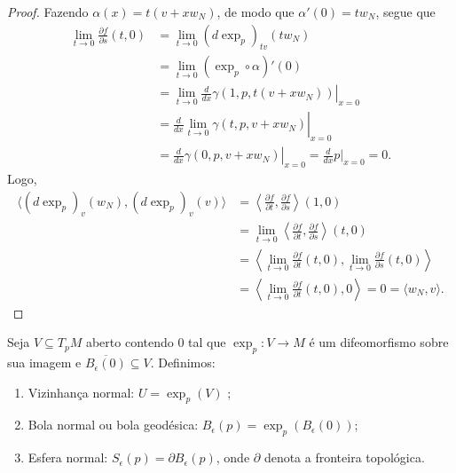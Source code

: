 \begin{theorem}
\begin{proof}
        Fazendo $\alpha(x) =t(v+xw_{N})$, de modo que $\alpha'(0)=tw_{N}$, segue que
        \begin{align*}
            \lim_{t \to 0} \frac{\partial f}{\partial s}(t,0) & = \lim_{t \to 0} (d\exp_p)_{tv} (t w_N)                                                   \\
                                                              & = \lim_{t \to 0} (\exp_p \circ \alpha)'(0)                                                \\
                                                              & = \lim_{t \to 0} \left. \frac{d}{dx} \gamma(1, p, t(v + x w_N)) \right|_{x=0}             \\
                                                              & = \left. \frac{d}{dx} \lim_{t \to 0} \gamma(t, p, v + x w_N) \right|_{x=0}                \\
                                                              & = \left. \frac{d}{dx} \gamma(0, p, v + x w_N) \right|_{x=0}  = \frac{d}{dx} p|_{x=0} = 0.
        \end{align*}
        Logo,
        \begin{align*}
            \langle (d\exp_p)_v (w_N), (d\exp_p)_v (v) \rangle & = \left\langle \frac{\partial f}{\partial t}, \frac{\partial f}{\partial s} \right\rangle (1,0)                                                                    \\
                                                               & = \lim_{t \to 0} \left\langle \frac{\partial f}{\partial t}, \frac{\partial f}{\partial s} \right\rangle (t,0)                                                     \\
                                                               & = \left\langle \lim_{t \to 0} \frac{\partial f}{\partial t}(t,0), \lim_{t \to 0} \frac{\partial f}{\partial s}(t,0) \right\rangle                                  \\
                                                               & = \left\langle \lim_{t \to 0} \frac{\partial f}{\partial t}(t,0), {0} \right\rangle                                               = 0 = {\langle w_N, v \rangle} .
        \end{align*}
    \end{proof}
\end{theorem}
\begin{definition}
    \label{def:bola-geodesica}
    Seja $V\subseteq T_{p}M$ aberto contendo $0$ tal que $\exp_{p}:V\to M$  é um difeomorfismo sobre sua imagem e $\overline{B_{\epsilon}(0)}\subseteq V$.
    Definimos:
    \begin{enumerate}[label=(\roman*)]
        \item Vizinhança normal:  $U=\exp_{p}(V)$ ;
        \item Bola normal ou bola geodésica: $B_{\epsilon}(p)=\exp_{p}(B_{\epsilon}(0))$;
        \item Esfera normal: $S_{\epsilon}(p)=\partial B_{\epsilon}(p)$, onde $\partial$ denota a fronteira topológica.
    \end{enumerate}
\end{definition}
